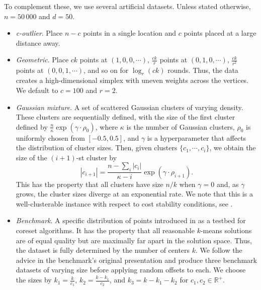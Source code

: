 To complement these, we use several artificial datasets. Unless stated otherwise, $n = 50\,000$ and $d=50$.
\begin{itemize}

    \item \emph{c-outlier}. Place $n-c$ points in a single location and $c$ points placed at a large distance away.

    \item \emph{Geometric}. Place $c k$ points at $(1, 0, 0, \cdots)$, $\frac{ck}{r}$ points at $(0, 1, 0, \cdots)$, $\frac{ck}{r^2}$ points
        at $(0, 0, 1, \cdots)$, and so on for $\log_r (ck)$ rounds. Thus, the data creates a high-dimensional simplex with uneven weights across the vertices. We
        default to $c = 100$ and $r=2$.

    \item \emph{Gaussian mixture}. A set of scattered Gaussian clusters of varying density. These clusters are sequentially defined, with the size of the first
        cluster defined by $\frac{n}{\kappa} \exp \left( \gamma \cdot \rho_0 \right)$, where $\kappa$ is the number of Gaussian clusters, $\rho_0$ is uniformly
        chosen from $[-0.5, 0.5]$, and $\gamma$ is a hyperparameter that affects the distribution of cluster sizes.  Then, given clusters $\{c_1, \cdots,
        c_i\}$, we obtain the size of the $(i+1)$-st cluster by \[|c_{i+1}| = \frac{n - \sum_i |c_i|}{\kappa - i}\exp \left( \gamma \cdot \rho_{i+1} \right).\]
        This has the property that all clusters have size $n / k$ when $\gamma = 0$ and, as $\gamma$ grows, the cluster sizes diverge at an exponential rate.
        We note that this is a well-clusterable instance with respect to cost stability conditions, see \cite{AwS12,Cohen-AddadS17,KuK10,ORSS12}.

    \item \emph{Benchmark}. A specific distribution of points introduced in \cite{chrisESA} as a testbed for coreset algorithms.  It has the property that
        all reasonable $k$-means solutions are of equal quality but are maximally far apart in the solution space. Thus, the dataset is fully determined by the
        number of centers $k$. We follow the advice in the benchmark's original presentation and produce three benchmark datasets of varying size before
        applying random offsets to each. We choose the sizes by $k_1 = \frac{k}{c_1}$, $k_2 = \frac{k - k_1}{c_2}$, and $k_3 = k - k_1 - k_2$ for $c_1, c_2 \in
        \mathbb{R}^+$.

\end{itemize}

